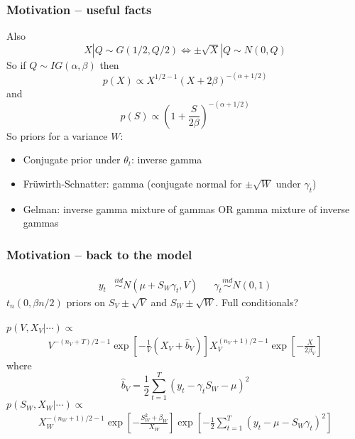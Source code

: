 \documentclass[xcolor=dvipsnames]{beamer}
\begin{document}
\begin{frame}
\frametitle{Motivation -- useful facts}
Also
\[
X|Q\sim G(1/2,Q/2) \iff \pm \sqrt{X}|Q \sim N(0,Q)
\]
\pause
So if $Q\sim IG(\alpha,\beta)$ then
\[
p(X) \propto X^{1/2-1}(X + 2\beta )^{-(\alpha + 1/2)}
\]
and 
\[
p(S) \propto \left(1 + \frac{S}{2\beta}\right)^{-(\alpha + 1/2)}
\]
\pause So priors for a variance $W$:
\begin{itemize}
\item Conjugate prior under $\theta_t$: inverse gamma
\item Fr{\"u}wirth-Schnatter: gamma (conjugate normal for $\pm\sqrt{W}$ under $\gamma_t$)
\item Gelman: inverse gamma mixture of gammas OR gamma mixture of inverse gammas
\end{itemize}
\end{frame}

\begin{frame}
\frametitle{Motivation -- back to the model}
\begin{align*}
 y_t &\stackrel{iid}{\sim} N(\mu + S_W\gamma_t, V) &&\gamma_t \stackrel{ind}{\sim} N(0,1)
\end{align*}
$t_n(0,\beta n/2)$ priors on $S_V\pm\sqrt{V}$ and $S_W\pm\sqrt{W}$. Full conditionals?\pause\\~\\
$p(V,X_V|\cdots)\propto$
\begin{align*}
V^{-(n_V + T)/2-1}\exp\left[-\frac{1}{V}\left(X_V + \hat{b}_V\right)\right]X_V^{(n_V+1)/2 - 1}\exp\left[-\frac{X}{2\beta_V}\right]
\end{align*}
where
\[
\hat{b}_V=\frac{1}{2}\sum_{t=1}^T\left(y_t - \gamma_tS_W - \mu\right)^2
\]
\pause $p(S_W,X_W|\cdots)\propto $
\begin{align*}
X_W^{-(n_W + 1)/2 - 1}\exp\left[-\frac{S_W^2 + \beta_W}{X_W}\right]\exp\left[-\frac{1}{2}\sum_{t=1}^T(y_t - \mu - S_W\gamma_t)^2\right]
\end{align*}

\end{frame}
\end{document}
